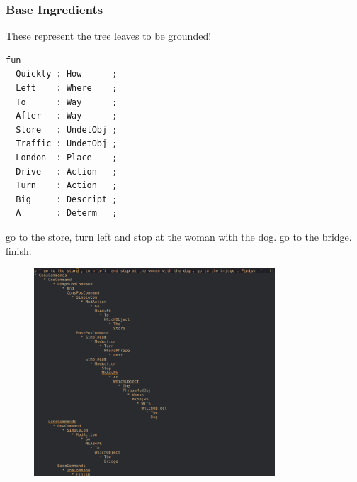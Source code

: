 \documentclass{beamer}
\begin{document}
\begin{frame}[fragile]
\frametitle{Base Ingredients}

These represent the tree leaves to be grounded!

\begin{verbatim}
fun
  Quickly : How      ;
  Left    : Where    ;
  To      : Way      ;
  After   : Way      ;
  Store   : UndetObj ;
  Traffic : UndetObj ;
  London  : Place    ;
  Drive   : Action   ;
  Turn    : Action   ;
  Big     : Descript ;
  A       : Determ   ;
\end{verbatim}
\end{frame}


\begin{frame}
\fontsize{9pt}{10pt}\selectfont
\begin{exampleblock}{}
go to the store, turn left and stop at the woman with the dog. go to the bridge. finish.
\end{exampleblock}

\begin{figure}

\centering
\includegraphics[width=90mm]{pics/wholeAST.png}
\end{figure}
\end{frame}
\end{document}
